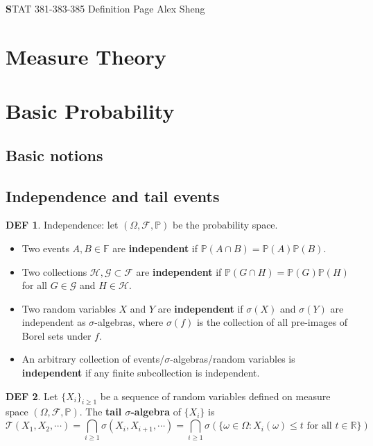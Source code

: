 \documentclass[hidelinks,11pt]{article}
\theoremstyle{definition}
\newtheorem*{defin}{DEF}
\theoremstyle{dotless}
\theoremstyle{remark}
\DeclareMathOperator{\1}{\mathbf{1}}
\begin{document}
\begin{center}
{\Large\textbf STAT 381-383-385 \hspace{0.1cm} Definition Page}\medbreak
\large{Alex Sheng}
\end{center}

\section{Measure Theory}

\section{Basic Probability}

\subsection{Basic notions}

\subsection{Independence and tail events}

\begin{defin}
Independence: let $(\Omega,\mathcal{F},\mathbb{P})$ be the probability space.\begin{itemize}
    \item Two events $A,B\in\mathbb{F}$ are \textbf{independent} if $\mathbb{P}(A\cap B)=\mathbb{P}(A)\mathbb{P}(B)$.
    \item Two collections $\mathcal{H},\mathcal{G}\subset\mathcal{F}$ are \textbf{independent} if $\mathbb{P}(G\cap H)=\mathbb{P}(G)\mathbb{P}(H)$ for all $G\in\mathcal{G}$ and $H\in\mathcal{H}$.
    \item Two random variables $X$ and $Y$ are \textbf{independent} if $\sigma(X)$ and $\sigma(Y)$ are independent as $\sigma$-algebras, where $\sigma(f)$ is the collection of all pre-images of Borel sets under $f$.
    \item An arbitrary collection of events/$\sigma$-algebras/random variables is \textbf{independent} if any finite subcollection is independent.
\end{itemize}
\end{defin}

\begin{defin}
Let $\{X_i\}_{i\geq1}$ be a sequence of random variables defined on measure space $(\Omega,\mathcal{F},\mathbb{P})$. The \textbf{tail $\sigma$-algebra} of $\{X_i\}$ is
\[\mathcal{T}(X_1,X_2,\cdots)=\bigcap_{i\geq1}\sigma(X_i,X_{i+1},\cdots)=\bigcap_{i\geq1}\sigma(\{\omega\in\Omega:X_i(\omega)\leq t\textrm{ for all }t\in\mathbb{R}\})\]
\end{defin}
\end{document}
